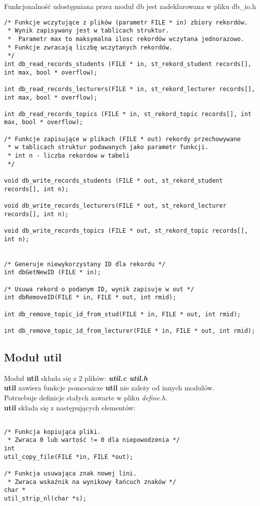 \documentclass[bibtotocnumbered, headsepline,normalheadings,12pt,polish]{scrreprt}
\begin{document}
Funkcjonalność udostępniana przez moduł db jest zadeklarowana w pliku db\_io.h
\begin{verbatim}
/* Funkcje wczytujące z plików (parametr FILE * in) zbiory rekordów.
 * Wynik zapisywany jest w tablicach struktur.
 *  Parametr max to maksymalna ilosc rekordów wczytana jednorazowo.
 * Funkcje zwracają liczbę wczytanych rekordów.
 */
int db_read_records_students (FILE * in, st_rekord_student records[], int max, bool * overflow);

int db_read_records_lecturers(FILE * in, st_rekord_lecturer records[], int max, bool * overflow);

int db_read_records_topics (FILE * in, st_rekord_topic records[], int max, bool * overflow);

/* Funkcje zapisujące w plikach (FILE * out) rekordy przechowywane
 * w tablicach struktur podawanych jako parametr funkcji.
 * int n - liczba rekordow w tabeli
 */

void db_write_records_students (FILE * out, st_rekord_student records[], int n);

void db_write_records_lecturers(FILE * out, st_rekord_lecturer records[], int n);

void db_write_records_topics (FILE * out, st_rekord_topic records[], int n);


/* Generuje niewykorzystany ID dla rekordu */
int dbGetNewID (FILE * in);

/* Usuwa rekord o podanym ID, wynik zapisuje w out */
int dbRemoveID(FILE * in, FILE * out, int rmid);

int db_remove_topic_id_from_stud(FILE * in, FILE * out, int rmid);

int db_remove_topic_id_from_lecturer(FILE * in, FILE * out, int rmid);
\end{verbatim}

\subsection{Moduł util}
\large
Moduł \textbf{util} składa się z 2 plików: \textit{\textbf{util.c util.h}}\\
\textbf{util} zawiera funkcje pomocnicze
\textbf{util} nie zależy od innych modułów.\\
Potrzebuje definicje stałych zawarte w pliku \large\emph{define.h}.\large\\

\textbf{util} składa się z następujących elementów:
\begin{verbatim}

/* Funkcja kopiująca pliki. 
 * Zwraca 0 lub wartość != 0 dla niepowodzenia */
int 
util_copy_file(FILE *in, FILE *out);

/* Funkcja usuwająca znak nowej lini. 
 * Zwraca wskaźnik na wynikowy łańcuch znaków */
char * 
util_strip_nl(char *s);

\end{verbatim}
\end{document}
